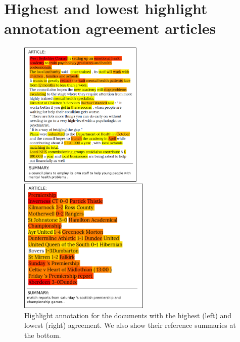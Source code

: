 \documentclass[11pt,a4paper]{article}
\begin{document}
\section{Highest and lowest highlight annotation agreement articles}
\begin{figure}[h]
    \centering
    \begin{minipage}{.45\textwidth}
    \centering
    \includegraphics[height=7cm]{heatmap_best}
    \end{minipage}
    \begin{minipage}{.45\textwidth}
    \centering
    \includegraphics[height=6.5cm]{heatmap_negative}
    \end{minipage}
    \caption{Highlight annotation for the documents with the highest (left) and lowest (right) agreement. We also show their reference summaries at the bottom.}
  \label{image:heatmap_both}
\end{figure}
\newpage
\end{document}
